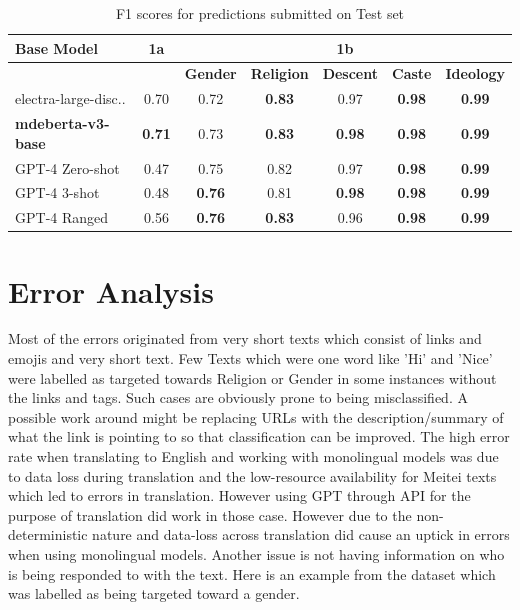 \documentclass[10pt, a4paper]{article}
\begin{document}
\begin{table}[h!]
\begin{center}
\begin{tabular}{|l|c|c|c|c|c|c|}
\hline
\textbf{Base Model} & \textbf{1a} & \multicolumn{5}{c|}{\textbf{1b}} \\
\hline
 & & \textbf{Gender} & \textbf{Religion} & \textbf{Descent} & \textbf{Caste} & \textbf{Ideology} \\
\hline
electra-large-disc.. & 0.70 & 0.72 & \textbf{0.83} & 0.97 & \textbf{0.98} & \textbf{0.99} \\
\hline
\textbf{mdeberta-v3-base} & \textbf{0.71} & 0.73 & \textbf{0.83} & \textbf{0.98} & \textbf{0.98} & \textbf{0.99} \\
\hline
GPT-4 Zero-shot & 0.47 & 0.75 & 0.82 & 0.97 & \textbf{0.98} & \textbf{0.99} \\
\hline
GPT-4 3-shot & 0.48 & \textbf{0.76} & 0.81 & \textbf{0.98} & \textbf{0.98} & \textbf{0.99} \\
\hline
GPT-4 Ranged & 0.56 & \textbf{0.76} & \textbf{0.83} & 0.96 & \textbf{0.98} & \textbf{0.99} \\
\hline
\end{tabular}
\caption{F1 scores for predictions submitted on Test set}
\label{table:9}
\end{center}
\end{table}

\section{Error Analysis}

Most of the errors originated from very short texts which consist of links and emojis and very short text. Few Texts which were one word like 'Hi' and 'Nice' were labelled as targeted towards Religion or Gender in some instances without the links and tags. Such cases are obviously prone to being misclassified. A possible work around might be replacing URLs with the description/summary of what the link is pointing to so that classification can be improved. The high error rate when translating to English and working with monolingual models was due to data loss during translation and the low-resource availability for Meitei texts which led to errors in translation. However using GPT through API for the purpose of translation did work in those case. However due to the non-deterministic nature and data-loss across translation did cause an uptick in errors when using monolingual models. Another issue is not having information on who is being responded to with the text. Here is an example from the dataset which was labelled as being targeted toward a gender. 
\end{document}
